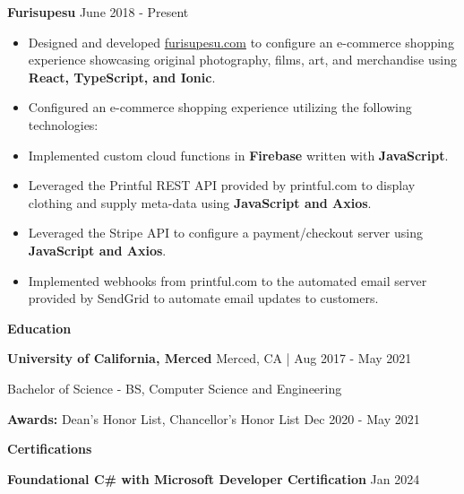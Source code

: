 \documentclass[10pt]{article}
\begin{document}
\textbf{Furisupesu} \hfill June 2018 - Present
\begin{itemize}[noitemsep]
    \item Designed and developed \href{https://furisupesu.com/}{furisupesu.com} to configure 
    an e-commerce shopping experience showcasing original photography, films, art, and merchandise using \textbf{React, TypeScript, and Ionic}.

    \item Configured an e-commerce shopping experience utilizing the following technologies:
    
    \item Implemented custom cloud functions in \textbf{Firebase} written with \textbf{JavaScript}.
    
    \item Leveraged the Printful REST API provided by printful.com to display clothing and supply meta-data using \textbf{JavaScript and Axios}. 
    
    \item Leveraged the Stripe API to configure a payment/checkout server using \textbf{JavaScript and Axios}.
    
    \item Implemented webhooks from printful.com to the automated email server provided by SendGrid to automate email updates to customers.
\end{itemize}

\begin{center}
    \textbf{Education}
    \hrulefill
\end{center}
\textbf{University of California, Merced} \hfill Merced, CA | Aug 2017 - May 2021

Bachelor of Science - BS, Computer Science and Engineering 

\textbf{Awards:} Dean's Honor List, Chancellor's Honor List \hfill Dec 2020 - May 2021

\begin{center}
    \textbf{Certifications}
    \hrulefill
\end{center}
\textbf{Foundational C\# with Microsoft Developer Certification} \hfill Jan 2024
\end{document}
